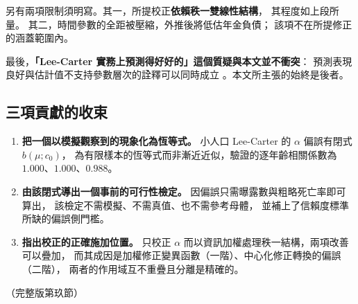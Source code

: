 \documentclass[UTF8, fontset=macnew, a4paper, 12pt]{ctexart}
\begin{document}
另有兩項限制須明寫。其一，所提校正\textbf{依賴秩一雙線性結構}，
其程度如上段所量。
其二，時間參數的全距被壓縮，外推後將低估年金負債；
該項不在所提修正的涵蓋範圍內。

最後，\textbf{「Lee-Carter 實務上預測得好好的」這個質疑與本文並不衝突}：
預測表現良好與估計值不支持參數層次的詮釋可以同時成立
\citep{bratsberg2026}。本文所主張的始終是後者。

\subsection{三項貢獻的收束}

\begin{enumerate}[label=\arabic*.]
\item \textbf{把一個以模擬觀察到的現象化為恆等式。}
小人口 Lee-Carter 的 $\alpha$ 偏誤有閉式 $b(\mu;c_0)$，
為有限樣本的恆等式而非漸近近似，驗證的逐年齡相關係數為
$1.000$、$1.000$、$0.988$。
\item \textbf{由該閉式導出一個事前的可行性檢定。}
因偏誤只需曝露數與粗略死亡率即可算出，
該檢定不需模擬、不需真值、也不需參考母體，
並補上了信賴度標準所缺的偏誤側門檻。
\item \textbf{指出校正的正確施加位置。}
只校正 $\alpha$ 而以資訊加權處理秩一結構，兩項改善可以疊加，
而其成因是加權修正變異函數（一階）、中心化修正轉換的偏誤（二階），
兩者的作用域互不重疊且分離是精確的。
\end{enumerate}

\noindent（完整版第玖節）

\clearpage


\end{document}
